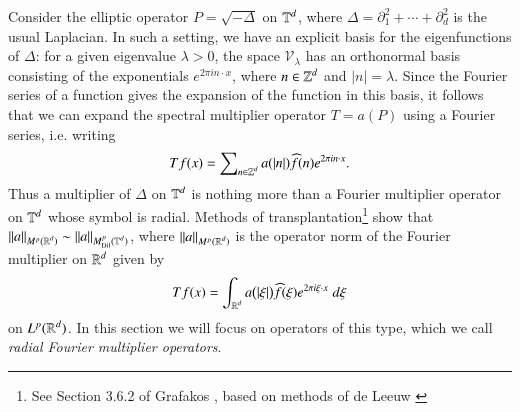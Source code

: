 Consider the elliptic operator $P = \sqrt{-\Delta}$ on $\operatorname{\mathbb{T}}^d$, where $\Delta = \partial_1^2 + \cdots + \partial_d^2$ is the usual Laplacian. In such a setting, we have an explicit basis for the eigenfunctions of $\Delta$: for a given eigenvalue $\lambda > 0$, the space $\mathcal{V}_\lambda$ has an orthonormal basis consisting of the exponentials $e^{2 \pi i n \cdot x}$, where $n \in \operatorname{\mathbb{Z}}^d$ and $|n| = \lambda$. Since the Fourier series of a function gives the expansion of the function in this basis, it follows that we can expand the spectral multiplier operator $T = a(P)$ using a Fourier series, i.e. writing
%
\begin{equation}
  Tf(x) = \sum\nolimits_{n \in \operatorname{\mathbb{Z}}^d} a( |n| ) \widehat{f}(n) e^{2 \pi i n \cdot x}.
\end{equation}
%
Thus a multiplier of $\Delta$ on $\operatorname{\mathbb{T}}^d$ is nothing more than a Fourier multiplier operator on $\operatorname{\mathbb{T}}^d$ whose symbol is radial. Methods of transplantation\footnote{See Section 3.6.2 of Grafakos \cite{Grafakos}, based on methods of de Leeuw \cite{deLeeuw}} show that $\| a \|_{M^p(\operatorname{\mathbb{R}}^d)} \sim \| a \|_{M^p_{\text{Dil}}(\operatorname{\mathbb{T}}^d)}$, where $\| a \|_{M^p(\operatorname{\mathbb{R}}^d)}$ is the operator norm of the Fourier multiplier on $\operatorname{\mathbb{R}}^d$ given by
%
\begin{equation}
  Tf(x) = \int_{\operatorname{\mathbb{R}}^d} a \big(|\xi| \big) \widehat{f}(\xi) e^{2 \pi i \xi \cdot x}\; d\xi 
\end{equation}
%
on $L^p(\operatorname{\mathbb{R}}^d)$. In this section we will focus on operators of this type, which we call \emph{radial Fourier multiplier operators}.

